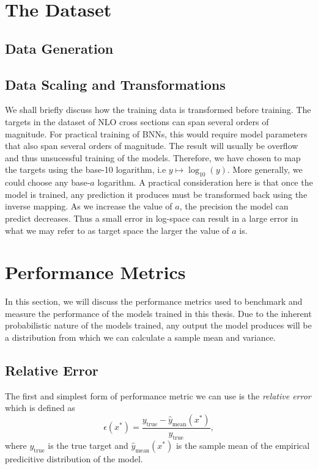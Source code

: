 \section{The Dataset}\label{sec:dataset}
\subsection{Data Generation}


\subsection{Data Scaling and Transformations}
We shall briefly discuss how the training data is transformed before training.
The targets in the dataset of NLO cross sections can span several orders of magnitude. For practical training of BNNs, this would require
model parameters that also span several orders of magnitude. The result will usually be overflow and thus unsucessful training of the models.
Therefore, we have chosen to map the targets using the base-10 logarithm, i.e $y \mapsto \log_{10}(y)$. More generally, we could choose any base-$a$ logarithm. A practical consideration here is that once the model is trained, any prediction it produces must be transformed back using
the inverse mapping. As we increase the value of $a$, the precision the model can predict decreases. Thus a small error in log-space 
can result in a large error in what we may refer to as target space the larger the value of $a$ is. 


\section{Performance Metrics}\label{seq:perf_metrics}
In this section, we will discuss the performance metrics used to benchmark and measure the performance of the models trained in this thesis.
Due to the inherent probabilistic nature of the models trained, any output the model produces will be a distribution from which we can calculate
a sample mean and variance.

\subsection{Relative Error}
The first and simplest form of performance metric we can use is the \textit{relative error} which is defined as
\begin{equation}
    \epsilon(x^*) = \frac{y_\text{true}- \hat{y}_\text{mean}(x^*)}{y_\text{true}},
\end{equation}
where $y_\text{true}$ is the true target and $\hat{y}_\text{mean}(x^*)$ is the sample mean of the empirical predicitive distribution of the model.

